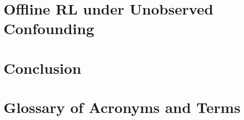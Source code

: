 \documentclass[11pt,notitlepage,a4paper]{article}
\begin{document}
\section{Offline RL under Unobserved Confounding}
\label{section:causal_rl}


\section{Conclusion}
\label{section:conclusion}






\appendix
\section{Glossary of Acronyms and Terms}
\label{appendix:glossary}

\end{document}
